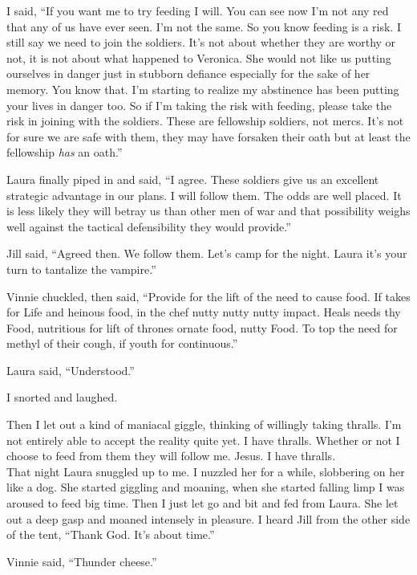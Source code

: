 I said, ``If you want me to try feeding I will. You can see now I'm not any red that any of us have ever seen. I'm not the same. So you know feeding is a risk. I still say we need to join the soldiers. It's not about whether they are worthy or not, it is not about what happened to Veronica. She would not like us putting ourselves in danger just in stubborn defiance especially for the sake of her memory. You know that. I'm starting to realize my abstinence has been putting your lives in danger too. So if I'm taking the risk with feeding, please take the risk in joining with the soldiers. These are fellowship soldiers, not mercs. It's not for sure we are safe with them, they may have forsaken their oath but at least the fellowship \textit{has} an oath.''

Laura finally piped in and said, ``I agree. These soldiers give us an excellent strategic advantage in our plans. I will follow them. The odds are well placed. It is less likely they will betray us than other men of war and that possibility weighs well against the tactical defensibility they would provide.''

Jill said, ``Agreed then. We follow them. Let's camp for the night. Laura it's your turn to tantalize the vampire.''

Vinnie chuckled, then said, ``Provide for the lift of the need to cause food. If takes for Life and heinous food, in the chef nutty nutty nutty impact. Heals needs thy Food, nutritious for lift of thrones ornate food, nutty Food. To top the need for methyl of their cough, if youth for continuous.''

Laura said, ``Understood.''

I snorted and laughed.

Then I let out a kind of maniacal giggle, thinking of willingly taking thralls. I'm not entirely able to accept the reality quite yet. I have thralls. Whether or not I choose to feed from them they will follow me. Jesus. I have thralls.\\

That night Laura snuggled up to me. I nuzzled her for a while, slobbering on her like a dog. She started giggling and moaning, when she started falling limp I was aroused to feed big time. Then I just let go and bit and fed from Laura. She let out a deep gasp and moaned intensely in pleasure. I heard Jill from the other side of the tent, ``Thank God. It's about time.''

Vinnie said, ``Thunder cheese.''

